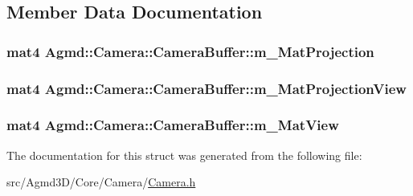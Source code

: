 \subsection{Member Data Documentation}
\hypertarget{struct_agmd_1_1_camera_1_1_camera_buffer_a677849c6b4e154b74d36ee8dc23f2702}{
\subsubsection[{m\+\_\+\+Mat\+Projection}]{\setlength{\rightskip}{0pt plus 5cm}mat4 Agmd\+::\+Camera\+::\+Camera\+Buffer\+::m\+\_\+\+Mat\+Projection}}\label{struct_agmd_1_1_camera_1_1_camera_buffer_a677849c6b4e154b74d36ee8dc23f2702}
\hypertarget{struct_agmd_1_1_camera_1_1_camera_buffer_a769a05a664a5af59588a9d355e992ab8}{
\subsubsection[{m\+\_\+\+Mat\+Projection\+View}]{\setlength{\rightskip}{0pt plus 5cm}mat4 Agmd\+::\+Camera\+::\+Camera\+Buffer\+::m\+\_\+\+Mat\+Projection\+View}}\label{struct_agmd_1_1_camera_1_1_camera_buffer_a769a05a664a5af59588a9d355e992ab8}
\hypertarget{struct_agmd_1_1_camera_1_1_camera_buffer_a0780ddb41b5b6d832793e68af2e901ed}{
\subsubsection[{m\+\_\+\+Mat\+View}]{\setlength{\rightskip}{0pt plus 5cm}mat4 Agmd\+::\+Camera\+::\+Camera\+Buffer\+::m\+\_\+\+Mat\+View}}\label{struct_agmd_1_1_camera_1_1_camera_buffer_a0780ddb41b5b6d832793e68af2e901ed}


The documentation for this struct was generated from the following file\+:\begin{DoxyCompactItemize}
\item 
src/\+Agmd3\+D/\+Core/\+Camera/\hyperlink{_camera_8h}{Camera.\+h}\end{DoxyCompactItemize}
